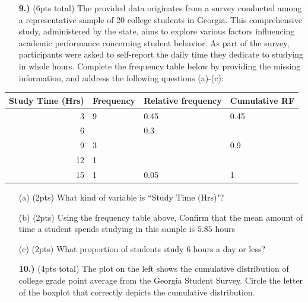 \documentclass[
]{article}
\begin{document}
\begin{enumerate}
\item[\bf 9.)] (6pts total) The provided data originates from a survey conducted among a representative sample of 20 college students in Georgia. This comprehensive study, administered by the state, aims to explore various factors influencing academic performance concerning student behavior. As part of the survey, participants were asked to self-report the daily time they dedicate to studying in whole hours. Complete the frequency table below by providing the missing information, and address the following questions (a)-(c):
\end{enumerate}

\begin{table}[H]
\centering
\begin{tabular}{r|l|l|l}
\hline
Study Time (Hrs) & Frequency & Relative frequency & Cumulative RF\\
\hline
3 & 9 & 0.45 & 0.45\\
\hline
6 &  & 0.3 & \\
\hline
9 & 3 &  & 0.9\\
\hline
12 & 1 &  & \\
\hline
15 & 1 & 0.05 & 1\\
\hline
\end{tabular}
\end{table}

\begin{itemize}
\item[(a)]{(2pts) What kind of variable is ``Study Time (Hrs)"?}
\item[]
\item[(b)]{(2pts) Using the frequency table above, Confirm that the mean amount of time a student spends studying in this sample is $5.85$ hours}
\item[]
\item[]
\item[]
\item[(c)]{(2pts) What proportion of students study 6 hours a day or less?}
\item[]
\end{itemize}

\newpage
\begin{enumerate}
\item[\bf 10.)] (4pts total) The plot on the left shows the cumulative distribution of college grade point average from the Georgia Student Survey. Circle the letter of the boxplot that correctly depicts the cumulative distribution.
\end{enumerate}
\end{document}
